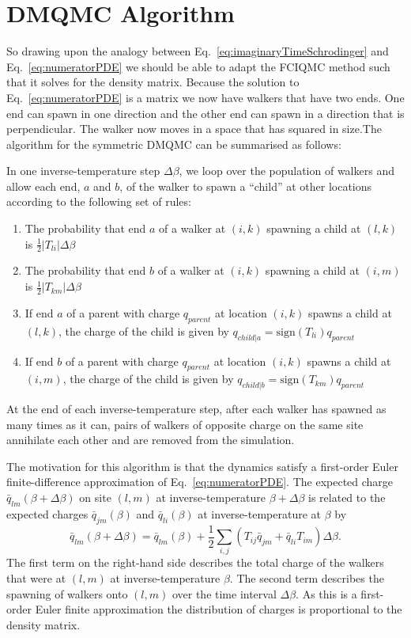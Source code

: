 \documentclass[12pt,a4paper]{article}
\begin{document}
\section{DMQMC Algorithm}
So drawing upon the analogy between  Eq.~\ref{eq:imaginaryTimeSchrodinger} and Eq.~\ref{eq:numeratorPDE} we should be able to adapt the FCIQMC method such that it solves for the density matrix. Because the solution to Eq.~\ref{eq:numeratorPDE} is a matrix we now have walkers that have two ends. One end can spawn in one direction and the other end can spawn in a direction that is perpendicular. The walker now moves in a space that has squared in size.The algorithm for the symmetric DMQMC can be summarised as follows:

In one inverse-temperature step $\Delta\beta$, we loop over the population of walkers and allow each end, $a$ and $b$, of the walker to spawn a ``child'' at other locations according to the following set of rules: 
\begin{enumerate}
\item The probability that end $a$ of a walker at $(i,k)$ spawning a child at $(l,k)$ is $\frac{1}{2}\left|T_{li}\right|\Delta\beta$
\item The probability that end $b$ of a walker at $(i,k)$ spawning a child at $(i,m)$ is $\frac{1}{2}\left|T_{km}\right|\Delta\beta$
\item If end $a$ of a parent with charge $q_{parent}$ at location $(i,k)$ spawns a child at $(l,k)$, the charge of the child is given by $q_{child | a}=\mbox{sign}(T_{li})q_{parent}$
\item If end $b$ of a parent with charge $q_{parent}$ at location $(i,k)$ spawns a child at $(i,m)$, the charge of the child is given by $q_{child | b}=\mbox{sign}(T_{km})q_{parent}$
\end{enumerate}
At the end of each inverse-temperature step, after each walker has spawned as many times as it can, pairs of walkers of opposite charge on the same site annihilate each other and are removed from the simulation.

The motivation for this algorithm is that the dynamics satisfy a first-order Euler finite-difference approximation of Eq.~\ref{eq:numeratorPDE}. The expected charge $\bar{q}_{lm}\left(\beta+\Delta\beta\right)$ on site $(l,m)$ at inverse-temperature $\beta + \Delta\beta$ is related to the expected charges $\bar{q}_{jm}\left(\beta\right)$ and  $\bar{q}_{li}\left(\beta\right)$ at inverse-temperature at $\beta$ by
\begin{equation}
\bar{q}_{lm}\left(\beta+\Delta\beta\right) = \bar{q}_{lm}\left(\beta\right)+\frac{1}{2}\sum_{i,j}\left(T_{ij}\bar{q}_{jm}+\bar{q}_{li}T_{im}\right)\Delta\beta.
\end{equation}
The first term on the right-hand side describes the total charge of the walkers that were at $(l,m)$ at inverse-temperature $\beta$. The second term describes the spawning of walkers onto $(l,m)$ over the time interval $\Delta\beta$. As this is a first-order Euler finite approximation the distribution of charges is proportional to the density matrix. 
\end{document}
